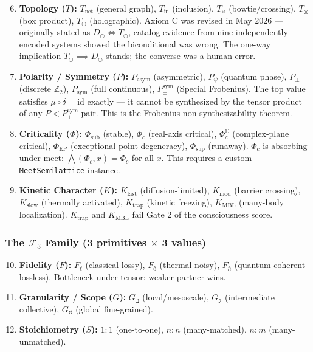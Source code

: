 \documentclass[12pt,a4paper]{article}
\begin{document}
\begin{enumerate}
\setcounter{enumi}{5}
    \item \textbf{Topology ($T$):} $T_\text{net}$ (general graph), $T_\text{in}$ (inclusion), $T_{\bowtie}$ (bowtie/crossing), $T_{\boxtimes}$ (box product), $T_{\odot}$ (holographic). Axiom C was revised in May 2026 --- originally stated as $D_{\odot} \iff T_{\odot}$, catalog evidence from nine independently encoded systems showed the biconditional was wrong. The one-way implication $T_{\odot} \implies D_{\odot}$ stands; the converse was a human error.
    \item \textbf{Polarity / Symmetry ($P$):} $P_\text{asym}$ (asymmetric), $P_{\psi}$ (quantum phase), $P_{\pm}$ (discrete $\mathbb{Z}_2$), $P_\text{sym}$ (full continuous), $P_{\pm}^{\text{sym}}$ (Special Frobenius). The top value satisfies $\mu \circ \delta = \text{id}$ exactly --- it cannot be synthesized by the tensor product of any $P < P_{\pm}^{\text{sym}}$ pair. This is the Frobenius non-synthesizability theorem.
    \item \textbf{Criticality ($\Phi$):} $\Phi_\text{sub}$ (stable), $\Phi_c$ (real-axis critical), $\Phi_c^\mathbb{C}$ (complex-plane critical), $\Phi_\text{EP}$ (exceptional-point degeneracy), $\Phi_\text{sup}$ (runaway). $\Phi_c$ is absorbing under meet: $\bigwedge(\Phi_c, x) = \Phi_c$ for all $x$. This requires a custom \texttt{MeetSemilattice} instance.
    \item \textbf{Kinetic Character ($K$):} $K_\text{fast}$ (diffusion-limited), $K_\text{mod}$ (barrier crossing), $K_\text{slow}$ (thermally activated), $K_\text{trap}$ (kinetic freezing), $K_\text{MBL}$ (many-body localization). $K_\text{trap}$ and $K_\text{MBL}$ fail Gate 2 of the consciousness score.
\end{enumerate}

\subsubsection{The $\mathcal{F}_3$ Family (3 primitives $\times$ 3 values)}

\begin{enumerate}
\setcounter{enumi}{9}
    \item \textbf{Fidelity ($F$):} $F_{\ell}$ (classical lossy), $F_{\eth}$ (thermal-noisy), $F_{\hbar}$ (quantum-coherent lossless). Bottleneck under tensor: weaker partner wins.
    \item \textbf{Granularity / Scope ($G$):} $G_{\beth}$ (local/mesoscale), $G_{\gimel}$ (intermediate collective), $G_{\aleph}$ (global fine-grained).
    \item \textbf{Stoichiometry ($S$):} $1{:}1$ (one-to-one), $n{:}n$ (many-matched), $n{:}m$ (many-unmatched).
\end{enumerate}
\end{document}

